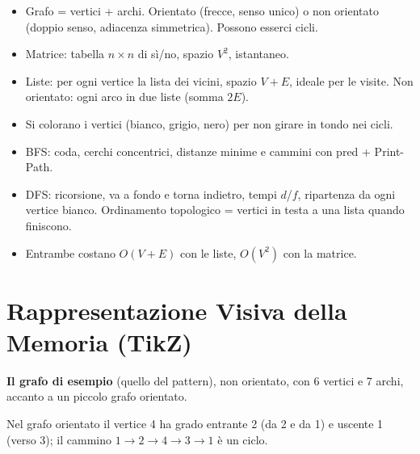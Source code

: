 \begin{inparole}
\begin{itemize}
  \item Grafo = vertici + archi. Orientato (frecce, senso unico) o non orientato
        (doppio senso, adiacenza simmetrica). Possono esserci cicli.
  \item Matrice: tabella $n \times n$ di sì/no, spazio $V^2$,  istantaneo.
  \item Liste: per ogni vertice la lista dei vicini, spazio $V + E$, ideale per le visite.
        Non orientato: ogni arco in due liste (somma $2E$).
  \item Si colorano i vertici (bianco, grigio, nero) per non girare in tondo nei cicli.
  \item BFS: coda, cerchi concentrici, distanze minime e cammini con pred + Print-Path.
  \item DFS: ricorsione, va a fondo e torna indietro, tempi $d$/$f$, ripartenza da ogni
        vertice bianco. Ordinamento topologico = vertici in testa a una lista quando
        finiscono.
  \item Entrambe costano $O(V + E)$ con le liste, $O(V^2)$ con la matrice.
\end{itemize}
\end{inparole}

\section{Rappresentazione Visiva della Memoria (TikZ)}

\textbf{Il grafo di esempio} (quello del pattern), non orientato, con 6 vertici e 7 archi,
accanto a un piccolo grafo orientato.
\begin{center}
\end{center}
Nel grafo orientato il vertice 4 ha grado entrante 2 (da 2 e da 1) e uscente 1 (verso 3);
il cammino $1 \to 2 \to 4 \to 3 \to 1$ è un ciclo.

